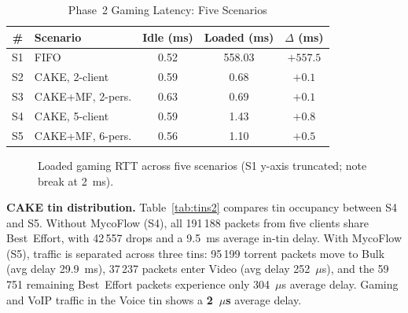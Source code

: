\documentclass[conference]{IEEEtran}
\begin{document}
\begin{table}[t]
\caption{Phase~2 Gaming Latency: Five Scenarios}
\label{tab:phase2}
\centering
\small
\begin{tabular}{clccc}
\toprule
\textbf{\#} & \textbf{Scenario} & \textbf{Idle (ms)} & \textbf{Loaded (ms)} & \textbf{$\Delta$ (ms)} \\
\midrule
S1 & FIFO              & 0.52 & 558.03 & $+557.5$ \\
S2 & CAKE, 2-client    & 0.59 &   0.68 & $+0.1$   \\
S3 & CAKE+MF, 2-pers.  & 0.63 &   0.69 & $+0.1$   \\
S4 & CAKE, 5-client    & 0.59 &   1.43 & $+0.8$   \\
S5 & CAKE+MF, 6-pers.  & 0.56 &   1.10 & $+0.5$   \\
\bottomrule
\end{tabular}
\end{table}

\begin{figure}[t]
\centering
{}
\caption{Loaded gaming RTT across five scenarios (S1 y-axis truncated;
note break at 2~ms).}
\label{fig:latbar}
\end{figure}

\textbf{CAKE tin distribution.}
Table~\ref{tab:tins2} compares tin occupancy between S4 and S5.
Without MycoFlow (S4), all 191\,188 packets from five clients share
Best~Effort, with 42\,557 drops and a 9.5~ms average in-tin delay.
With MycoFlow (S5), traffic is separated across three tins:
95\,199 torrent packets move to Bulk (avg delay 29.9~ms),
37\,237 packets enter Video (avg delay 252~$\mu$s),
and the 59\,751 remaining Best~Effort packets experience
only 304~$\mu$s average delay.
Gaming and VoIP traffic in the Voice tin shows a \textbf{2~$\mu$s}
average delay.
\end{document}
